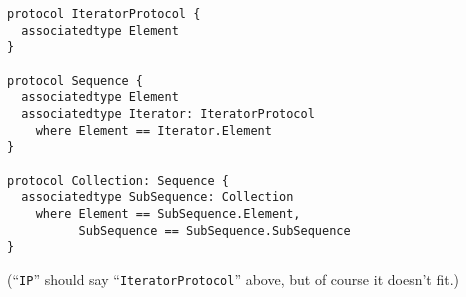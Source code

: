 \documentclass[../generics]{subfiles}
\begin{document}
\begin{listing}\label{conformance paths listing}
\begin{Verbatim}
protocol IteratorProtocol {
  associatedtype Element
}

protocol Sequence {
  associatedtype Element
  associatedtype Iterator: IteratorProtocol
    where Element == Iterator.Element
}

protocol Collection: Sequence {
  associatedtype SubSequence: Collection
    where Element == SubSequence.Element,
          SubSequence == SubSequence.SubSequence
}
\end{Verbatim}


\medskip


\medskip


\medskip


\medskip

\footnotesize{(``\texttt{IP}'' should say ``\texttt{IteratorProtocol}'' above, but of course it doesn't fit.)}
\end{listing}
\end{document}
